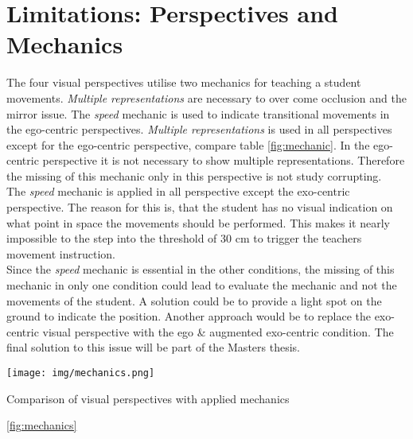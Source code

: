 \section{Limitations: Perspectives and Mechanics}
The four visual perspectives utilise two mechanics for teaching a student movements. \textit{Multiple representations} are necessary to over come occlusion and the mirror issue. The \textit{speed} mechanic is used to indicate transitional movements in the ego-centric perspectives. \textit{Multiple representations} is used in all perspectives except for the ego-centric perspective, compare table \ref{fig:mechanic}. In the ego-centric perspective it is not necessary to show multiple representations. Therefore the missing of this mechanic only in this perspective is not study corrupting.\\
The \textit{speed} mechanic is applied in all perspective except the exo-centric perspective. The reason for this is, that the student has no visual indication on what point in space the movements should be performed. This makes it nearly impossible to the step into the threshold of 30 cm to trigger the teachers movement instruction.\\
Since the \textit{speed} mechanic is essential in the other conditions, the missing of this mechanic in only one condition could lead to evaluate the mechanic and not the movements of the student. A solution could be to provide a light spot on the ground to indicate the position. Another approach would be to replace the exo-centric visual perspective with the ego \& augmented exo-centric condition. The final solution to this issue will be part of the Masters thesis.
\begin{table}
	\centering
	\texttt{[image: img/mechanics.png]}
	\caption{Comparison of visual perspectives with applied mechanics}
	\label{fig:mechanics}
\end{table}
\ref{fig:mechanics}
